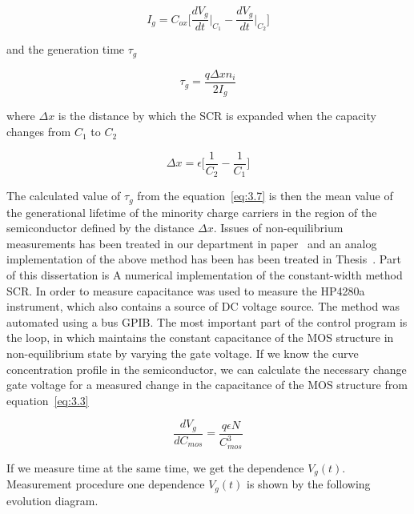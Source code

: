 \begin{equation}\label{eq:3.6}
  I_g = C_{ox} \bigg[\frac{dV_g}{dt}\Big\rvert_{C_1} - \frac{dV_g}{dt}\Big\rvert_{C_2}\bigg]
\end{equation}

and the generation time $\tau_g$

\begin{equation}\label{eq:3.7}
  \tau_g = \frac{q\Delta x n_i}{2I_g}
\end{equation}

where $\Delta x$ is the distance by which the SCR is expanded when the
capacity changes from $C_1$ to $C_2$

\begin{equation}\label{eq:3.8}
  \Delta x = \epsilon \Big[\frac{1}{C_2} - \frac{1}{C_1}\Big]
\end{equation}

The calculated value of $\tau_g$ from the equation~\ref{eq:3.7} is
then the mean value of the generational lifetime of the minority
charge carriers in the region of the semiconductor defined by the
distance $\Delta x$.  Issues of non-equilibrium measurements has been
treated in our department in paper~\cite{1.6} and an analog
implementation of the above method has been has been treated in
Thesis~\cite{3.13}. Part of this dissertation is A numerical
implementation of the constant-width method SCR\@. In order to measure
capacitance was used to measure the HP4280a instrument, which also
contains a source of DC voltage source. The method was automated using
a bus GPIB. The most important part of the control program is the
loop, in which maintains the constant capacitance of the MOS structure
in non-equilibrium state by varying the gate voltage.  If we know the
curve concentration profile in the semiconductor, we can calculate
the necessary change gate voltage for a measured change in the
capacitance of the MOS structure from equation~\ref{eq:3.3}

\begin{equation}\label{eq:3.9}
  \frac{dV_g}{dC_{mos}} = \frac{q\epsilon N}{C^3_{mos}}
\end{equation}

If we measure time at the same time, we get the dependence
$V_g(t)$. Measurement procedure one dependence $V_g(t)$ is shown by
the following evolution diagram.

